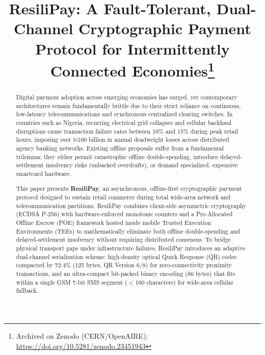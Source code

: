 \documentclass[conference]{IEEEtran}
\begin{document}
\title{ResiliPay: A Fault-Tolerant, Dual-Channel Cryptographic Payment Protocol for Intermittently Connected Economies\thanks{Archived on Zenodo (CERN/OpenAIRE): \url{https://doi.org/10.5281/zenodo.23451943}}}

\author{
}

\maketitle

\begin{abstract}
Digital payment adoption across emerging economies has surged, yet contemporary architectures remain fundamentally brittle due to their strict reliance on continuous, low-latency telecommunications and synchronous centralized clearing switches. In countries such as Nigeria, recurring electrical grid collapses and cellular backhaul disruptions cause transaction failure rates between 10\% and 15\% during peak retail hours, imposing over $\mathbb{N}$100 billion in annual deadweight losses across distributed agency banking networks. Existing offline proposals suffer from a fundamental trilemma: they either permit catastrophic offline double-spending, introduce delayed-settlement insolvency risks (unbacked overdrafts), or demand specialized, expensive smartcard hardware.

This paper presents \textbf{ResiliPay}, an asynchronous, offline-first cryptographic payment protocol designed to sustain retail commerce during total wide-area network and telecommunication partitions. ResiliPay combines client-side asymmetric cryptography (ECDSA P-256) with hardware-enforced monotonic counters and a Pre-Allocated Offline Escrow (POE) framework hosted inside mobile Trusted Execution Environments (TEEs) to mathematically eliminate both offline double-spending and delayed-settlement insolvency without requiring distributed consensus. To bridge physical transport gaps under infrastructure failures, ResiliPay introduces an adaptive dual-channel serialization scheme: high-density optical Quick Response (QR) codes compacted by 72.4\% (125 bytes, QR Version 6/8) for zero-connectivity proximity transactions, and an ultra-compact bit-packed binary encoding (86 bytes) that fits within a single GSM 7-bit SMS segment ($<$160 characters) for wide-area cellular fallback. 


\end{abstract}
\end{document}
